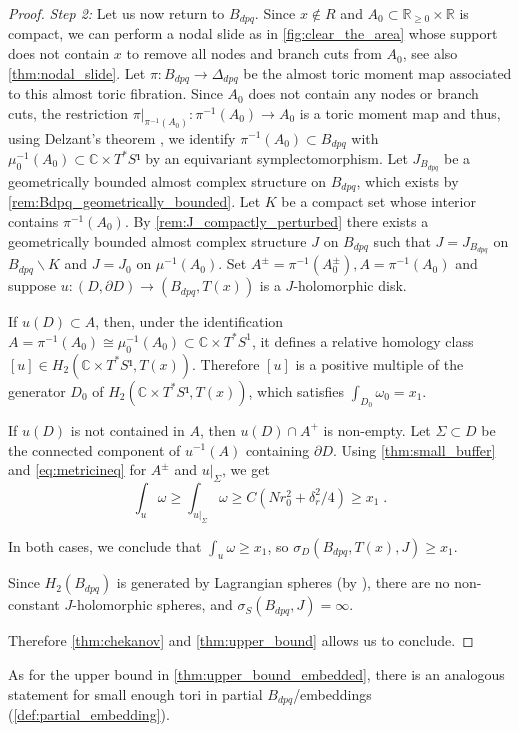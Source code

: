\documentclass[12pt,a4paper,abstract=true,final]{scrartcl}
\begin{document}
\begin{proof}
  \emph{Step 2:}
  Let us now return to $B_{dpq}$.
  Since $x \notin R$ and $A_0 \subset \mathbb{R}_{≥ 0} \times \mathbb{R}$ is compact, we can perform a nodal slide as in \cref{fig:clear_the_area} whose support does not contain $x$ to remove all nodes and branch cuts from $A_0$, see also \cref{thm:nodal_slide}.
  Let $\pi \colon B_{dpq} \rightarrow \Delta_{dpq}$ be the almost toric moment map associated to this almost toric fibration.
  Since $A_0$ does not contain any nodes or branch cuts, the restriction $\pi\vert_{\pi^{-1}(A_0)} \colon \pi^{-1}(A_0) \rightarrow A_0$ is a toric moment map and thus, using Delzant's theorem \cite[Theorem 2.1]{Del88}, we identify $\pi^{-1}(A_0) ⊂ B_{dpq}$ with $μ_0^{-1}(A_0) ⊂ ℂ × T^* S¹$ by an equi\-va\-ri\-ant symplectomorphism.
  Let $J_{B_{dpq}}$ be a geometrically bounded almost complex structure on $B_{dpq}$, which exists by \cref{rem:Bdpq_geometrically_bounded}.
  Let $K$ be a compact set whose interior contains $π^{-1}(A_0)$.
  By \cref{rem:J_compactly_perturbed} there exists a geometrically bounded almost complex structure $J$ on $B_{dpq}$ such that $J=J_{B_{dpq}}$ on $B_{dpq} ∖ K$ and $J=J_0$ on $μ^{-1}(A_0)$.
  Set $A^± = \pi^{-1}(A_0^±), A = \pi^{-1}(A_0)$ and suppose $u\colon (D,∂D) → (B_{dpq}, T(x))$ is a $J$-holomorphic disk. 
  
  If $u(D) ⊂ A$, then, under the identification $A=\pi^{-1}(A_0) \cong μ_0^{-1}(A_0) \subset \mathbb{C} \times T^*S^1$, it defines a relative homology class $[u] ∈ H_2(ℂ × T^*S¹, T(x))$.
Therefore $[u]$ is a positive multiple of the generator $D_0$ of $H_2(ℂ × T^*S¹, T(x))$, which satisfies $∫_{D_0} ω_0 = x_1$.
  
  If $u(D)$ is not contained in $A$, then $u(D) ∩ A^+$ is non-empty.
Let $Σ ⊂ D$ be the connected component of $u^{-1}(A)$ containing $∂D$.
Using \cref{thm:small_buffer} and \eqref{eq:metricineq} for $A^±$ and $u|_Σ$, we get
  \[∫_u ω ≥ ∫_{u|_Σ} ω ≥ C(Nr_0^2 + δ_r^2/4) ≥ x_1 \;. \]

In both cases, we conclude that $∫_{u} ω ≥ x_1$, so $σ_D(B_{dpq},T(x),J) ≥ x_1$.

Since $H_2(B_{dpq})$ is generated by Lagrangian spheres (by \cite[Lemma 7.11]{evans2021atfs}), there are no non-constant $J$-holomorphic spheres, and $σ_S(B_{dpq},J) = ∞$.

Therefore \cref{thm:chekanov} and \cref{thm:upper_bound} allows us to conclude.
\end{proof}

As for the upper bound in \cref{thm:upper_bound_embedded}, there is an analogous statement for small enough tori in partial $B_{dpq}$\-/embeddings (\cref{def:partial_embedding}).
\end{document}
